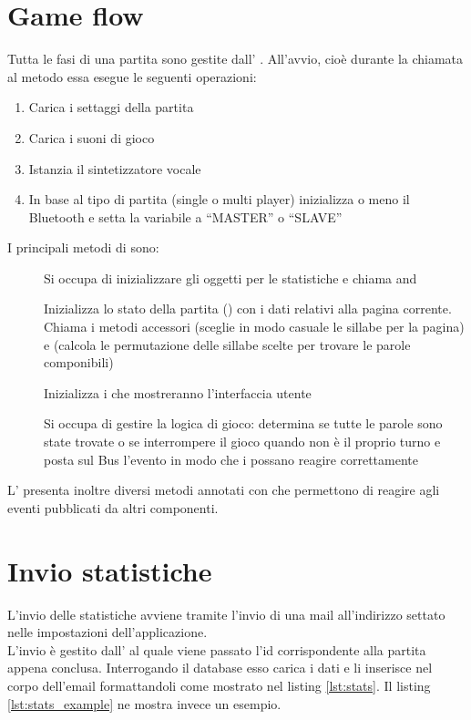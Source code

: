 \section{Game flow}
\label{sec:game_flow}
Tutta le fasi di una partita sono gestite dall' .
All'avvio, cioè durante la chiamata al metodo  essa esegue le seguenti operazioni:
\begin{enumerate}
\item Carica i settaggi della partita
\item Carica i suoni di gioco
\item Istanzia il sintetizzatore vocale 
\item In base al tipo di partita (single o multi player) inizializza o meno il Bluetooth e setta la variabile  a ``MASTER'' o ``SLAVE''
\end{enumerate}

I principali metodi di  sono:
\begin{description}
\item[] Si occupa di inizializzare gli oggetti per le statistiche e chiama  and 
\item[] Inizializza lo stato della partita () con i dati relativi alla pagina corrente. Chiama i metodi accessori  (sceglie in modo casuale le sillabe per la pagina) e  (calcola le permutazione delle sillabe scelte per trovare le parole componibili)
\item[] Inizializza i  che mostreranno l'interfaccia utente
\item[] Si occupa di gestire la logica di gioco: determina se tutte le parole sono state trovate o se interrompere il gioco quando non è il proprio turno e posta sul Bus l'evento  in modo che i  possano reagire correttamente
\end{description}

L' presenta inoltre diversi metodi annotati con  che permettono di reagire agli eventi pubblicati da altri componenti.

\section{Invio statistiche}
\label{sec:stats_send}
L'invio delle statistiche avviene tramite l'invio di una mail all'indirizzo settato nelle impostazioni dell'applicazione.\\
L'invio è gestito dall'  al quale viene passato l'id corrispondente alla partita appena conclusa. Interrogando il database esso carica i dati e li inserisce nel corpo dell'email formattandoli come mostrato nel listing \ref{lst:stats}. Il listing \ref{lst:stats_example} ne mostra invece un esempio.

